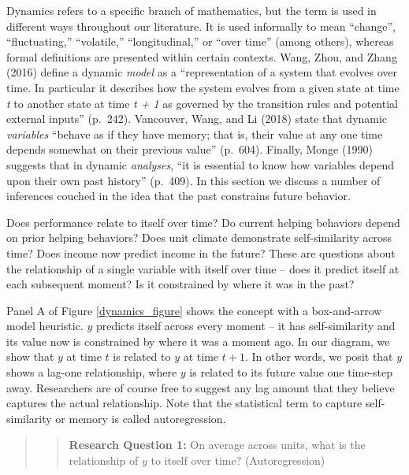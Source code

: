 \documentclass[english,,man]{apa6}
\theoremstyle{definition}
\theoremstyle{definition}
\theoremstyle{definition}
\theoremstyle{remark}
\begin{document}
Dynamics refers to a specific branch of mathematics, but the term is
used in different ways throughout our literature. It is used informally
to mean \enquote{change}, \enquote{fluctuating,} \enquote{volatile,}
\enquote{longitudinal,} or \enquote{over time} (among others), whereas
formal definitions are presented within certain contexts. Wang, Zhou,
and Zhang (2016) define a dynamic \emph{model} as a
\enquote{representation of a system that evolves over time. In
particular it describes how the system evolves from a given state at
time \emph{t} to another state at time \emph{t + 1} as governed by the
transition rules and potential external inputs} (p.~242). Vancouver,
Wang, and Li (2018) state that dynamic \emph{variables} \enquote{behave
as if they have memory; that is, their value at any one time depends
somewhat on their previous value} (p.~604). Finally, Monge (1990)
suggests that in dynamic \emph{analyses}, \enquote{it is essential to
know how variables depend upon their own past history} (p.~409). In this
section we discuss a number of inferences couched in the idea that the
past constrains future behavior.

Does performance relate to itself over time? Do current helping
behaviors depend on prior helping behaviors? Does unit climate
demonstrate self-similarity across time? Does income now predict income
in the future? These are questions about the relationship of a single
variable with itself over time -- does it predict itself at each
subsequent moment? Is it constrained by where it was in the past?

Panel A of Figure \ref{dynamics_figure} shows the concept with a
box-and-arrow model heuristic. \(y\) predicts itself across every moment
-- it has self-similarity and its value now is constrained by where it
was a moment ago. In our diagram, we show that \(y\) at time \(t\) is
related to \(y\) at time \(t + 1\). In other words, we posit that \(y\)
shows a lag-one relationship, where \(y\) is related to its future value
one time-step away. Researchers are of course free to suggest any lag
amount that they believe captures the actual relationship. Note that the
statistical term to capture self-similarity or memory is called
autoregression.

\begin{quote}
\begin{quote}
\textbf{Research Question 1:} On average across units, what is the
relationship of \(y\) to itself over time? (Autoregression)
\end{quote}
\end{quote}
\end{document}

